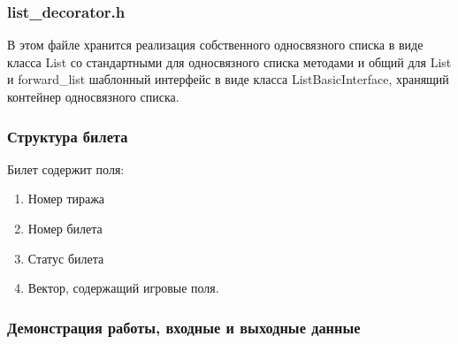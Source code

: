 \documentclass[a4paper,14pt]{article}
\begin{document}
\subsubsection{list\_decorator.h}
В этом файле хранится реализация собственного односвязного списка в виде класса List со стандартными для односвязного списка методами и общий для List и forward\_list шаблонный интерфейс в виде класса ListBasicInterface, хранящий контейнер односвязного списка.

\subsubsection{Структура билета}

Билет содержит поля:
\begin{enumerate} 
  \item Номер тиража
  \item Номер билета
  \item Статус билета
  \item Вектор, содержащий игровые поля.
\end{enumerate}

\clearpage
\begin{center}
    \subsubsection{Демонстрация работы, входные и выходные данные}
\end{center}
\end{document}
